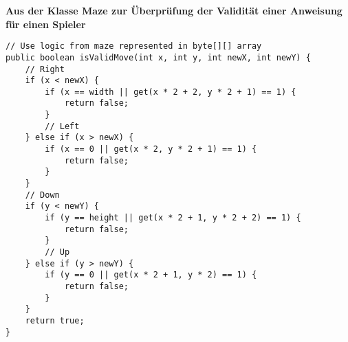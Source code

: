 \documentclass[a4paper,10pt,ngerman]{scrartcl}
\begin{document}
\textbf{Aus der Klasse Maze zur Überprüfung der Validität einer Anweisung für einen Spieler}
\begin{lstlisting}
// Use logic from maze represented in byte[][] array
public boolean isValidMove(int x, int y, int newX, int newY) {
    // Right
    if (x < newX) {
        if (x == width || get(x * 2 + 2, y * 2 + 1) == 1) {
            return false;
        }
        // Left
    } else if (x > newX) {
        if (x == 0 || get(x * 2, y * 2 + 1) == 1) {
            return false;
        }
    }
    // Down
    if (y < newY) {
        if (y == height || get(x * 2 + 1, y * 2 + 2) == 1) {
            return false;
        }
        // Up
    } else if (y > newY) {
        if (y == 0 || get(x * 2 + 1, y * 2) == 1) {
            return false;
        }
    }
    return true;
}
\end{lstlisting}
\end{document}
